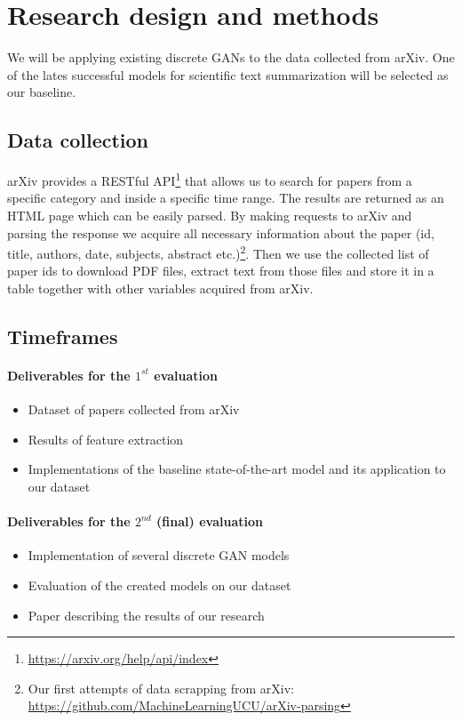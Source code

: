 \documentclass[sigplan]{acmart}
\begin{document}
\section{Research design and methods}

We will be applying existing discrete GANs to the data collected from arXiv. One of the lates successful models  for scientific text summarization will be selected as our baseline.

\subsection{Data collection}

arXiv provides a RESTful API\footnote{\url{https://arxiv.org/help/api/index}} that allows us to search for papers from a specific category and inside a specific time range. The results are returned as an HTML page which can be easily parsed. By making requests to arXiv and parsing the response we acquire all necessary information about the paper (id, title, authors, date, subjects, abstract etc.)\footnote{Our first attempts of data scrapping from arXiv:\\ \url{https://github.com/MachineLearningUCU/arXiv-parsing}}. Then we use the collected list of paper ids to download PDF files, extract text from those files and store it in a table together with other variables acquired from arXiv.

\subsection{Timeframes}

\paragraph{Deliverables for the $1^{st}$ evaluation}
\begin{itemize}
\item Dataset of papers collected from arXiv
\item Results of feature extraction
\item Implementations of the baseline state-of-the-art model and its application to our dataset
\end{itemize}

\paragraph{Deliverables for the $2^{nd}$ (final) evaluation}
\begin{itemize}
\item Implementation of several discrete GAN models
\item Evaluation of the created models on our dataset
\item Paper describing the results of our research
\end{itemize}
\end{document}
